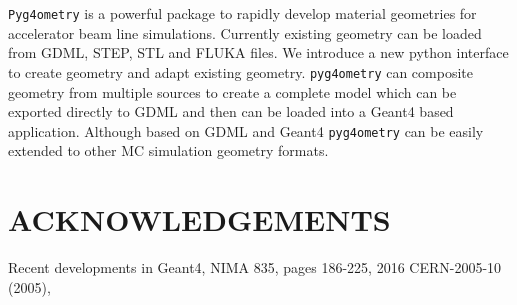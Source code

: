 \documentclass[a4paper,
               keeplastbox,   %
               ]{jacow}
\begin{document}
\verb|Pyg4ometry| is a powerful package to rapidly develop material geometries for accelerator beam line simulations. Currently existing geometry can
be loaded from GDML, STEP, STL and FLUKA files. We introduce a new python interface to create geometry and adapt existing geometry. \verb|pyg4ometry| 
can composite geometry from multiple sources to create a complete model which can be exported directly to GDML and then can be loaded into a Geant4 
based application. Although based on GDML and Geant4 \verb|pyg4ometry| can be easily extended to other MC simulation geometry formats.  

\section{ACKNOWLEDGEMENTS}

%
%

%
	{\printbibliography}%
	{%
	
	\begin{thebibliography}{9} %
	
	 Recent developments in Geant4, NIMA 835, pages 186-225, 2016 
	 CERN-2005-10 (2005), 
	

	\end{thebibliography}
} %


% 
\end{document}

